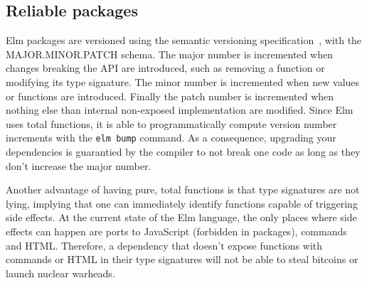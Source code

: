 


\subsection{Reliable packages}%
\label{sub:reliable_packages}


Elm packages are versioned using
the semantic versioning specification~\cite{semanticversioning},
with the MAJOR.MINOR.PATCH schema.
The major number is incremented when changes breaking the API are introduced,
such as removing a function or modifying its type signature.
The minor number is incremented when new values or functions are introduced.
Finally the patch number is incremented when nothing else than internal
non-exposed implementation are modified.
Since Elm uses total functions, it is able to programmatically compute
version number increments with the \verb|elm bump| command.
As a consequence, upgrading your dependencies is guarantied by the compiler
to not break one code as long as they don't increase the major number.

Another advantage of having pure, total functions is that type signatures are not lying,
implying that one can immediately identify functions capable of triggering side effects.
At the current state of the Elm language,
the only places where side effects can happen are
ports to JavaScript (forbidden in packages), commands and HTML.
Therefore, a dependency that doesn't expose functions with commands or HTML
in their type signatures will not be able to steal bitcoins or launch nuclear warheads.
